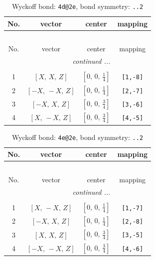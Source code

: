 \documentclass[fleqn,8pt]{jsarticle}
\begin{document}
\begin{longtable}{cccc}
\caption{Wyckoff bond: {\tt 4d@2e}, bond symmetry: {\tt ..2}}
 \\
 \hline \hline
No. & vector & center & mapping \\ \hline \endfirsthead

\multicolumn{3}{l}{\tablename\ \thetable{}} \\
 \hline \hline
No. & vector & center & mapping \\ \hline \endhead

 \hline \hline
\multicolumn{3}{r}{\footnotesize\it continued ...} \\ \endfoot

 \hline \hline
\multicolumn{3}{r}{} \\ \endlastfoot

1 & $\left[ X,\, X,\, Z \right]$ & $\left[ 0,\, 0,\, \frac{1}{4} \right]$ & {\tt [1,-8]} \\ \hline
2 & $\left[ - X,\, - X,\, Z \right]$ & $\left[ 0,\, 0,\, \frac{1}{4} \right]$ & {\tt [2,-7]} \\ \hline
3 & $\left[ - X,\, X,\, Z \right]$ & $\left[ 0,\, 0,\, \frac{3}{4} \right]$ & {\tt [3,-6]} \\ \hline
4 & $\left[ X,\, - X,\, Z \right]$ & $\left[ 0,\, 0,\, \frac{3}{4} \right]$ & {\tt [4,-5]} \\
\end{longtable}
\renewcommand{\arraystretch}{1.2}
\begin{longtable}{cccc}
\caption{Wyckoff bond: {\tt 4e@2e}, bond symmetry: {\tt ..2}}
 \\
 \hline \hline
No. & vector & center & mapping \\ \hline \endfirsthead

\multicolumn{3}{l}{\tablename\ \thetable{}} \\
 \hline \hline
No. & vector & center & mapping \\ \hline \endhead

 \hline \hline
\multicolumn{3}{r}{\footnotesize\it continued ...} \\ \endfoot

 \hline \hline
\multicolumn{3}{r}{} \\ \endlastfoot

1 & $\left[ X,\, - X,\, Z \right]$ & $\left[ 0,\, 0,\, \frac{1}{4} \right]$ & {\tt [1,-7]} \\ \hline
2 & $\left[ - X,\, X,\, Z \right]$ & $\left[ 0,\, 0,\, \frac{1}{4} \right]$ & {\tt [2,-8]} \\ \hline
3 & $\left[ X,\, X,\, Z \right]$ & $\left[ 0,\, 0,\, \frac{3}{4} \right]$ & {\tt [3,-5]} \\ \hline
4 & $\left[ - X,\, - X,\, Z \right]$ & $\left[ 0,\, 0,\, \frac{3}{4} \right]$ & {\tt [4,-6]} \\
\end{longtable}
\end{document}
